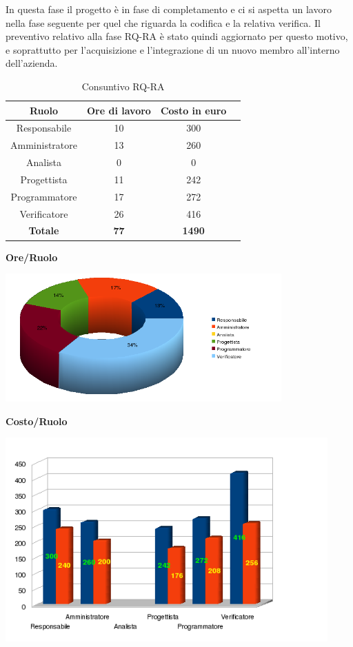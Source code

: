 In questa fase il progetto \`e in fase di completamento e ci si aspetta un lavoro nella fase seguente per quel che riguarda la codifica e la relativa verifica. Il preventivo relativo alla fase RQ-RA \`e stato quindi aggiornato per questo motivo, e soprattutto per l'acquisizione e l'integrazione di un nuovo membro all'interno dell'azienda.

\newpage

\begin{table}[h]
	\begin{center}
		  \begin{tabular}{|c|c|c|c|}
		 \hline 
		 \textbf{Ruolo} & \textbf{Ore di lavoro} & \textbf{Costo in euro}\\
		 \hline
		Responsabile & 10 & 300 \\
		Amministratore & 13 & 260\\
		Analista & 0 & 0\\
		Progettista & 11 & 242\\
		Programmatore & 17 & 272\\
		Verificatore & 26 & 416\\
        \hline
        \textbf{Totale} & \textbf{77} & \textbf{1490}\\
		\hline
		\end{tabular}
	\caption{Consuntivo RQ-RA} 
	\label{tab:cons_RPP-RQ}
	\end{center}	
\end{table}

\begin{center}\textbf{Ore/Ruolo}
\end{center}
\includegraphics[width=300pt]{Cons-RQ-RA1}
\newpage

\begin{center}\textbf{Costo/Ruolo}
\end{center}
\includegraphics[width=350pt]{Cons-RQ-RA2}


